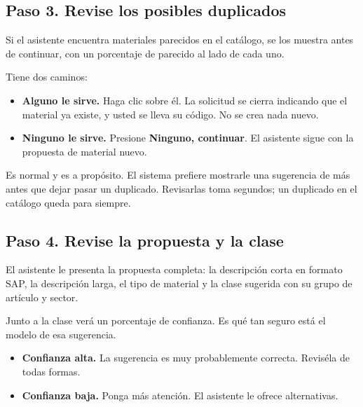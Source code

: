 \subsection{Paso 3. Revise los posibles duplicados}

Si el asistente encuentra materiales parecidos en el catálogo, se los muestra
antes de continuar, con un porcentaje de parecido al lado de cada uno.


Tiene dos caminos:

\begin{itemize}[leftmargin=*, itemsep=3pt]
  \item \textbf{Alguno le sirve.} Haga clic sobre él. La solicitud se cierra
        indicando que el material ya existe, y usted se lleva su código. No se
        crea nada nuevo.
  \item \textbf{Ninguno le sirve.} Presione \textbf{Ninguno, continuar}. El
        asistente sigue con la propuesta de material nuevo.
\end{itemize}

\begin{nota}
Es normal y es a propósito. El sistema prefiere mostrarle una sugerencia de más
antes que dejar pasar un duplicado. Revisarlas toma segundos; un duplicado en
el catálogo queda para siempre.
\end{nota}

\subsection{Paso 4. Revise la propuesta y la clase}

El asistente le presenta la propuesta completa: la descripción corta en formato
SAP, la descripción larga, el tipo de material y la clase sugerida con su grupo
de artículo y sector.


Junto a la clase verá un porcentaje de confianza. Es qué tan seguro está el
modelo de esa sugerencia.

\begin{itemize}[leftmargin=*, itemsep=3pt]
  \item \textbf{Confianza alta.} La sugerencia es muy probablemente correcta.
        Reviséla de todas formas.
  \item \textbf{Confianza baja.} Ponga más atención. El asistente le ofrece
        alternativas.
\end{itemize}

